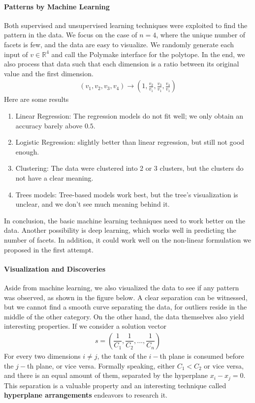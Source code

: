 \documentclass[12pt,letterpaper]{article}
\newcommand*{\R}{\mathbb{R}}
\begin{document}
\paragraph{Patterns by Machine Learning}
Both supervised and unsupervised learning techniques were exploited to find the pattern in the data. 
We focus on the case of $n = 4$, where the unique number of facets is few, and the data are easy to visualize.
We randomly generate each input of $v \in \R^4$ and call the Polymake interface for the polytope. In the end, 
we also process that data such that each dimension is a ratio between its original value and the first dimension. 
\begin{align*}
 (v_1, v_2, v_3, v_4) \rightarrow \left(1, \frac{v_2}{v_1}, \frac{v_3}{v_1}, \frac{v_4}{v_1} \right)
\end{align*}
Here are some results
\begin{enumerate}
    \item Linear Regression: The regression models do not fit well; we only obtain an accuracy barely above $0.5$.
    \item Logistic Regression: slightly better than linear regression, but still not good enough.
    \item Clustering: The data were clustered into 2 or 3 clusters, but the clusters do not have a clear meaning.
    \item Trees models: Tree-based models work best, but the tree's visualization is unclear, and we don't see much meaning behind it.
\end{enumerate}
In conclusion, the basic machine learning techniques need to work better on the data. Another possibility is 
deep learning, which works well in predicting the number of facets. In addition, it could work well on the non-linear formulation we proposed in the first attempt.

\paragraph{Visualization and Discoveries}
Aside from machine learning, we also visualized the data to see if any pattern was observed, as shown in the figure below. 
A clear separation can be witnessed, but we cannot find a smooth curve separating the data, for outliers reside 
in the middle of the other category. 
On the other hand, the data themselves also yield interesting properties. If we consider a solution vector 
\begin{align*}
 s = \left( \dfrac{1}{C_1}, \dfrac{1}{C_2}, ..., \dfrac{1}{C_n} \right)
\end{align*}
For every two dimensions $ i \neq j$, the tank of the $i-$th plane is consumed before the $j-$th plane, or vice versa.
Formally speaking, either $C_1 < C_2$ or vice versa, and there is an equal amount of them, separated by the hyperplane 
$x_i - x_j = 0$. This separation is a valuable property and an interesting technique called \textbf{hyperplane arrangements} 
endeavors to research it.
\end{document}
